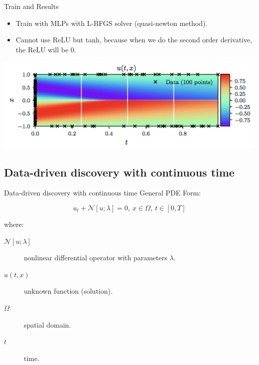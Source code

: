 \documentclass[aspectratio=1610,xcolor={dvipsnames},hyperref={colorlinks,unicode,linkcolor=violet,anchorcolor=BlueViolet,citecolor=YellowOrange,filecolor=black,urlcolor=Aquamarine}]{beamer}
\begin{document}
\begin{frame}[label={sec:orgd2c9a64}]{Train and Results}
\begin{itemize}
\item Train with MLPs with L-BFGS solver (quasi-newton method).
\item Cannot use ReLU but tanh, because when we do the second order derivative, the ReLU will be 0.
\end{itemize}

\begin{center}
\includegraphics[width=.9\linewidth]{./p7.png}
\end{center}
\end{frame}

\subsection{Data-driven discovery with continuous time}
\label{sec:org9698a8a}

\begin{frame}[label={sec:org7b92568}]{Data-driven discovery with continuous time}
General PDE Form:

\[u_t + \mathcal{N}[u;\lambda] = 0,\ x \in \Omega, \ t\in[0,T]\]

where:
\begin{description}
\item[{\(\mathcal{N}[u;\lambda]\)}] nonlinear differential operator with parameters \(\lambda\).
\item[{\(u(t, x)\)}] unknown function (solution).
\item[{\(\Omega\)}] spatial domain.
\item[{\(t\)}] time.
\end{description}
\end{frame}
\end{document}
